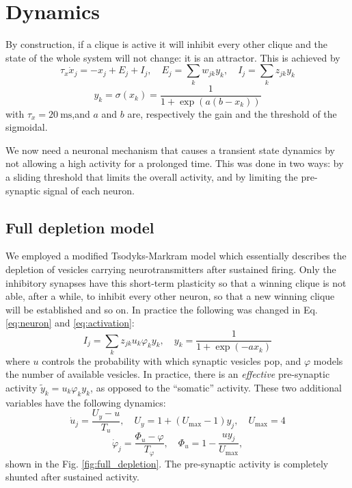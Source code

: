\documentclass[10pt,a4paper]{article}
\begin{document}
	\section{Dynamics}
		By construction, if a clique is active it will inhibit every other clique and the state of the whole system will not change: it is an attractor. This is achieved by
		\begin{equation}
			\tau_x \dot{x}_j = -x_j + E_j + I_j, \quad E_j = \sum_{k} w_{jk} y_k, \quad I_j = \sum_k z_{jk} y_k
			\label{eq:neuron}
		\end{equation}
		\begin{equation}
			y_k = \sigma \left(x_k\right) = \frac{1}{1+\exp \left(a  \left(b - x_k \right)\right) }
			\label{eq:activation}
		\end{equation}
		with $\tau_x = 20 \ \text{ms}$,and $a$ and $b$ are, respectively the gain and the threshold of the sigmoidal.
		
		We now need a neuronal mechanism that causes a transient state dynamics by not allowing a high activity for a prolonged time. This was done in two ways: by a sliding threshold that limits the overall activity, and by limiting the pre-synaptic signal of each neuron.
		
		\subsection{Full depletion model}
		We employed a modified Tsodyks-Markram model which essentially describes the depletion of vesicles carrying neurotransmitters after sustained firing. Only the inhibitory synapses have this short-term plasticity so that a winning clique is not able, after a while, to inhibit every other neuron, so that a new winning clique will be established and so on. In practice the following was changed in Eq. \ref{eq:neuron} and \ref{eq:activation}:
		\begin{equation}
			I_j = \sum_k z_{jk} u_k \varphi_k y_k, \quad y_k = \frac{1}{1+\exp \left(- a x_k \right)}
		\end{equation}
		where $u$ controls the probability with which synaptic vesicles pop, and $\varphi$ models the number of available vesicles. In practice, there is an \emph{effective} pre-synaptic activity $\tilde{y}_k = u_k \varphi_k y_k$, as opposed to the ``somatic'' activity. These two additional variables have the following dynamics:
		\begin{equation}
			\dot{u}_j = \frac{U_y -u}{T_u}, \quad U_y = 1 + \left( U_\text{max} -1 \right) y_j, \quad U_\text{max} = 4
		\end{equation}
		\begin{equation}
		\dot{\varphi}_j = \frac{\varPhi_u - \varphi}{T_\varphi}, \quad \varPhi_u = 1- \frac{u y_j}{U_\text{max}},
		\end{equation}
		shown in the Fig. \ref{fig:full_depletion}. The pre-synaptic activity is completely shunted after sustained activity.
		
\end{document}
